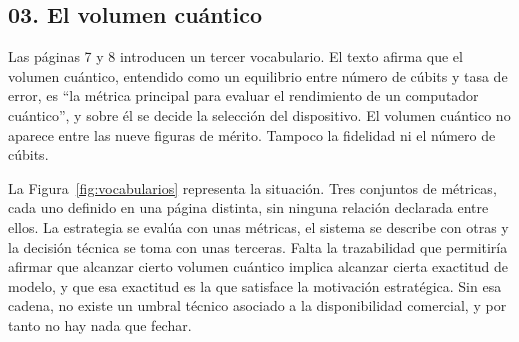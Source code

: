 \documentclass[11pt,letterpaper]{article}
\begin{document}
\subsection*{03. El volumen cuántico}

Las páginas 7 y 8 introducen un tercer vocabulario. El texto afirma que el
volumen cuántico, entendido como un equilibrio entre número de cúbits y tasa de
error, es \enquote{la métrica principal para evaluar el rendimiento de un
computador cuántico}, y sobre él se decide la selección del dispositivo. El
volumen cuántico no aparece entre las nueve figuras de mérito. Tampoco la
fidelidad ni el número de cúbits.

La Figura~\ref{fig:vocabularios} representa la situación. Tres conjuntos de
métricas, cada uno definido en una página distinta, sin ninguna relación
declarada entre ellos. La estrategia se evalúa con unas métricas, el sistema se
describe con otras y la decisión técnica se toma con unas terceras. Falta la
trazabilidad que permitiría afirmar que alcanzar cierto volumen cuántico
implica alcanzar cierta exactitud de modelo, y que esa exactitud es la que
satisface la motivación estratégica. Sin esa cadena, no existe un umbral
técnico asociado a la disponibilidad comercial, y por tanto no hay nada que
fechar.
\end{document}
